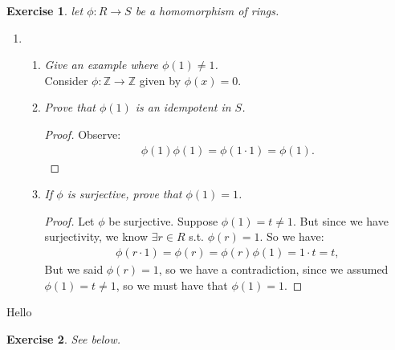 \documentclass[10pt,oneside,reqno]{amsart}
\theoremstyle{plain}
\newtheorem{e}{Exercise}
\theoremstyle{definition}
\begin{document}
\begin{e}
let $\phi: R \to S$ be a homomorphism of rings. 
\end{e}

\begin{enumerate}
\item 
\begin{enumerate}


\item \textit{Give an example where $\phi(1) \neq 1$.}
\\Consider $\phi:\mathbb{Z} \to \mathbb{Z}$ given by $\phi(x) = 0$. \\

\item \textit{Prove that $\phi(1)$ is an idempotent in $S$. }\\
\begin{proof}
Observe: 
\begin{equation}
\begin{aligned}
\phi(1)\phi(1) = \phi(1\cdot 1) = \phi(1). 
\end{aligned}
\end{equation}
\end{proof}
\item \textit{If $\phi$ is surjective, prove that $\phi(1) = 1$. }
\begin{proof}
Let $\phi$ be surjective. Suppose $\phi(1)  = t \neq 1$. But since we have surjectivity, we know $\exists r \in R$ s.t. $\phi(r) = 1$. So we have: 
\begin{equation}
\begin{aligned}
\phi(r \cdot 1) = \phi(r) = \phi(r)\phi(1) = 1 \cdot t = t,
\end{aligned}
\end{equation}
But we said $\phi(r) = 1$, so we have a contradiction, since we assumed $\phi(1) = t \neq 1$, so we must have that $\phi(1) = 1$. 
\end{proof}
\end{enumerate}
\end{enumerate}
Hello
\begin{e} See below. 
\end{e}
\end{document}
